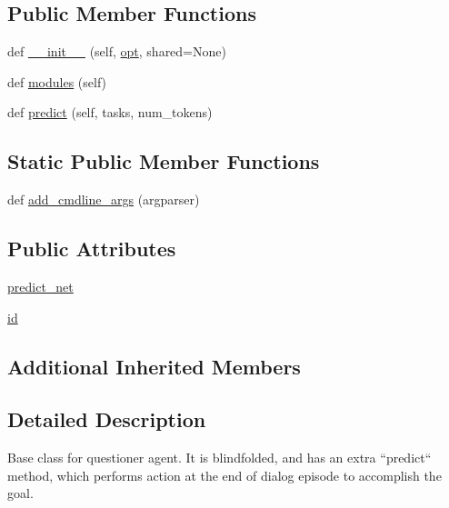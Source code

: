 \subsection*{Public Member Functions}
\begin{DoxyCompactItemize}
\item 
def \hyperlink{classtaskntalk_1_1coopgame__agent_1_1QuestionerAgent_a8b466649607d4913b7b5fa08742f4337}{\+\_\+\+\_\+init\+\_\+\+\_\+} (self, \hyperlink{classparlai_1_1core_1_1agents_1_1Agent_ab3b45d2754244608c75d4068b90cd051}{opt}, shared=None)
\item 
def \hyperlink{classtaskntalk_1_1coopgame__agent_1_1QuestionerAgent_a94ebb3a2a2faadf94a5b89612d104d8a}{modules} (self)
\item 
def \hyperlink{classtaskntalk_1_1coopgame__agent_1_1QuestionerAgent_a46ac14fab9bc4a6b6eeb24f4fe013927}{predict} (self, tasks, num\+\_\+tokens)
\end{DoxyCompactItemize}
\subsection*{Static Public Member Functions}
\begin{DoxyCompactItemize}
\item 
def \hyperlink{classtaskntalk_1_1coopgame__agent_1_1QuestionerAgent_a4f6b01d401778df8b6196432b1851515}{add\+\_\+cmdline\+\_\+args} (argparser)
\end{DoxyCompactItemize}
\subsection*{Public Attributes}
\begin{DoxyCompactItemize}
\item 
\hyperlink{classtaskntalk_1_1coopgame__agent_1_1QuestionerAgent_a6ee5fbf93467c4069cadb42626de6c5d}{predict\+\_\+net}
\item 
\hyperlink{classtaskntalk_1_1coopgame__agent_1_1QuestionerAgent_abc7eacb9c5c02bb00c838d72aef7cf54}{id}
\end{DoxyCompactItemize}
\subsection*{Additional Inherited Members}


\subsection{Detailed Description}
\begin{DoxyVerb}Base class for questioner agent. It is blindfolded, and has an extra
``predict`` method, which performs action at the end of dialog episode
to accomplish the goal.
\end{DoxyVerb}
 

